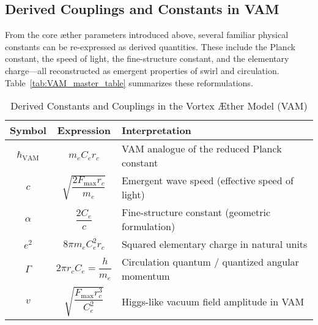 \subsection*{Derived Couplings and Constants in VAM}

From the core æther parameters introduced above, several familiar physical constants can be re-expressed as derived quantities. These include the Planck constant, the speed of light, the fine-structure constant, and the elementary charge—all reconstructed as emergent properties of swirl and circulation. Table~\ref{tab:VAM_master_table} summarizes these reformulations.




\begin{table}[H]
    \centering
    \begin{tabular}{|c|c|l|}
        \hline
        \textbf{Symbol} & \textbf{Expression} & \textbf{Interpretation} \\
        \hline
        $\hbar_\text{VAM}$ & $m_e C_e r_c$ & VAM analogue of the reduced Planck constant \\
        \hline
        $c$ & $\sqrt{\dfrac{2 F_\text{max} r_c}{m_e}}$ & Emergent wave speed (effective speed of light) \\
        \hline
        $\alpha$ & $\dfrac{2 C_e}{c}$ & Fine-structure constant (geometric formulation) \\
        \hline
        $e^2$ & $8\pi m_e C_e^2 r_c$ & Squared elementary charge in natural units \\
        \hline
        $\Gamma$ & $2\pi r_c C_e = \dfrac{h}{m_e}$ & Circulation quantum / quantized angular momentum \\
        \hline
        $v$ & $\sqrt{\dfrac{F_\text{max} r_c^3}{C_e^2}}$ & Higgs-like vacuum field amplitude in VAM \\
        \hline
    \end{tabular}
    \caption{Derived Constants and Couplings in the Vortex Æther Model (VAM)}
    \label{tab:VAM_constants}
\end{table}


